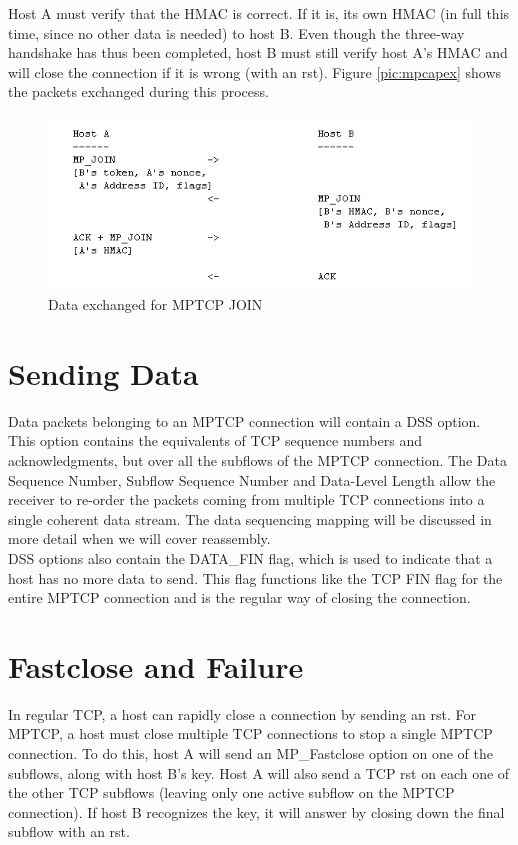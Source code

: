 Host A must verify that the HMAC is correct. If it is, its own HMAC (in full this time, since no other data is needed) to host B. Even though the three-way handshake has thus been completed, host B must still verify host A's HMAC and will close the connection if it is wrong (with an rst). Figure  \ref{pic:mpcapex} shows the packets exchanged during this process.

\begin{figure}[!t]
\centering
\includegraphics[scale= 0.6]{Figures/mpjoinex.png}
\caption{Data exchanged for MPTCP JOIN}
\label{pic:mpjoinex}
\end{figure}

\section{Sending Data}
Data packets belonging to an MPTCP connection will contain a DSS option. This option contains the equivalents of TCP sequence numbers and acknowledgments, but over all the subflows of the MPTCP connection. The Data Sequence Number, Subflow Sequence Number and Data-Level Length allow the receiver to re-order the packets coming from multiple TCP connections into a single coherent data stream. The data sequencing mapping will be discussed in more detail when we will cover reassembly. \\

DSS options also contain the DATA\_FIN flag, which is used to indicate that a host has no more data to send. This flag functions like the TCP FIN flag for the entire MPTCP connection and is the regular way of closing the connection.

\section{Fastclose and Failure}
In regular TCP, a host can rapidly close a connection by sending an rst. For MPTCP, a host must close multiple TCP connections to stop a single MPTCP connection. To do this, host A will send an MP\_Fastclose option on one of the subflows, along with host B's key. Host A will also send a TCP rst on each one of the other TCP subflows (leaving only one active subflow on the MPTCP connection). If host B recognizes the key, it will answer by closing down the final subflow with an rst. \\

